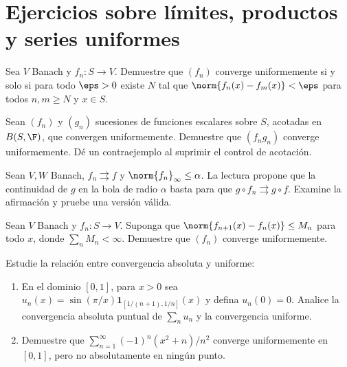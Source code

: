 \section{Ejercicios sobre límites, productos y series uniformes}
\begin{ejercicio}\label{ej:lectura-26-1}\label{ch26:ej1}
Sea $V$ Banach y $f_n:S\to V$. Demuestre que $(f_n)$ converge uniformemente si y solo si para todo $\eps>0$ existe $N$ tal que $\norm{f_n(x)-f_m(x)}<\eps$ para todos $n,m\ge N$ y $x\in S$.
\end{ejercicio}


\begin{ejercicio}\label{ej:lectura-26-2}
Sean $(f_n)$ y $(g_n)$ sucesiones de funciones escalares sobre $S$, acotadas en $B(S,\F)$, que convergen uniformemente. Demuestre que $(f_ng_n)$ converge uniformemente. Dé un contraejemplo al suprimir el control de acotación.
\end{ejercicio}


\begin{ejercicio}\label{ej:lectura-26-3}
Sean $V,W$ Banach, $f_n\rightrightarrows f$ y $\norm{f_n}_\infty\le\alpha$. La lectura propone que la continuidad de $g$ en la bola de radio $\alpha$ basta para que $g\circ f_n\rightrightarrows g\circ f$. Examine la afirmación y pruebe una versión válida.
\end{ejercicio}


\begin{ejercicio}\label{ej:lectura-26-4}
Sean $V$ Banach y $f_n:S\to V$. Suponga que $\norm{f_{n+1}(x)-f_n(x)}\le M_n$ para todo $x$, donde $\sum_nM_n<\infty$. Demuestre que $(f_n)$ converge uniformemente.
\end{ejercicio}


\begin{ejercicio}\label{ej:lectura-26-5}
Estudie la relación entre convergencia absoluta y uniforme:
\begin{enumerate}[label=(\roman*)]
\item En el dominio $[0,1]$, para $x>0$ sea $u_n(x)=\sin(\pi/x)\mathbf1_{[1/(n+1),1/n]}(x)$ y defina $u_n(0)=0$. Analice la convergencia absoluta puntual de $\sum_nu_n$ y la convergencia uniforme.
\item Demuestre que $\sum_{n=1}^\infty(-1)^n(x^2+n)/n^2$ converge uniformemente en $[0,1]$, pero no absolutamente en ningún punto.
\end{enumerate}
\end{ejercicio}


